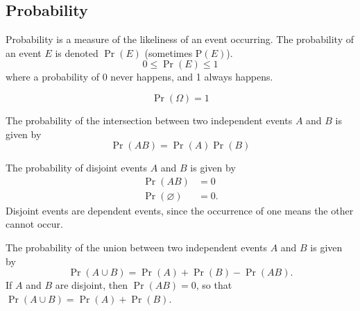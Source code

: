 \documentclass{article}
\begin{document}
\subsection{Probability}
\begin{definition}[Probability]
    Probability is a measure of the likeliness of an event occurring. The probability of
    an event \(E\) is denoted \(\Pr{\left( E \right)}\) (sometimes \(\mathrm{P}\left( E \right)\)).
    \begin{equation*}
        0 \le \Pr{\left( E \right)} \le 1
    \end{equation*}
    where a probability of 0 never happens, and 1 always happens.
\end{definition}
\begin{theorem}
    \begin{equation*}
        \Pr{\left( \Omega \right)} = 1
    \end{equation*}
\end{theorem}
\begin{theorem}
    The probability of the intersection between two independent events \(A\) and \(B\) is given by
    \begin{equation*}
        \Pr{\left( AB \right)} = \Pr{\left( A \right)} \Pr{\left( B \right)}
    \end{equation*}
\end{theorem}
\begin{theorem}
    The probability of disjoint events \(A\) and \(B\) is given by
    \begin{align*}
        \Pr{\left( AB \right)}          & = 0  \\
        \Pr{\left( \varnothing \right)} & = 0.
    \end{align*}
    Disjoint events are dependent events, since the occurrence of one means the other cannot occur.
\end{theorem}
\begin{theorem}
    The probability of the union between two independent events \(A\) and \(B\) is given by
    \begin{equation*}
        \Pr{\left( A \cup B \right)} = \Pr{\left( A \right)} + \Pr{\left( B \right)} - \Pr{\left( AB \right)}.
    \end{equation*}
    If \(A\) and \(B\) are disjoint, then \(\Pr{\left( AB \right)} = 0\), so that \(\Pr{\left( A \cup B \right)} = \Pr{\left( A \right)} + \Pr{\left( B \right)}\).
\end{theorem}
\end{document}
